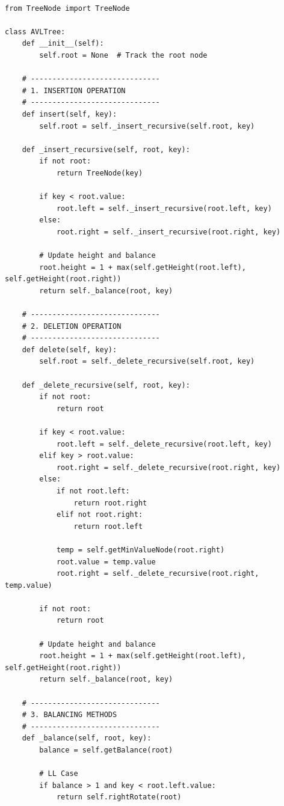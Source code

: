 \begin{lstlisting}
    
from TreeNode import TreeNode

class AVLTree:
    def __init__(self):
        self.root = None  # Track the root node

    # ------------------------------
    # 1. INSERTION OPERATION
    # ------------------------------
    def insert(self, key):
        self.root = self._insert_recursive(self.root, key)

    def _insert_recursive(self, root, key):
        if not root:
            return TreeNode(key)

        if key < root.value:
            root.left = self._insert_recursive(root.left, key)
        else:
            root.right = self._insert_recursive(root.right, key)

        # Update height and balance
        root.height = 1 + max(self.getHeight(root.left), self.getHeight(root.right))
        return self._balance(root, key)

    # ------------------------------
    # 2. DELETION OPERATION
    # ------------------------------
    def delete(self, key):
        self.root = self._delete_recursive(self.root, key)

    def _delete_recursive(self, root, key):
        if not root:
            return root

        if key < root.value:
            root.left = self._delete_recursive(root.left, key)
        elif key > root.value:
            root.right = self._delete_recursive(root.right, key)
        else:
            if not root.left:
                return root.right
            elif not root.right:
                return root.left

            temp = self.getMinValueNode(root.right)
            root.value = temp.value
            root.right = self._delete_recursive(root.right, temp.value)

        if not root:
            return root

        # Update height and balance
        root.height = 1 + max(self.getHeight(root.left), self.getHeight(root.right))
        return self._balance(root, key)

    # ------------------------------
    # 3. BALANCING METHODS
    # ------------------------------
    def _balance(self, root, key):
        balance = self.getBalance(root)

        # LL Case
        if balance > 1 and key < root.left.value:
            return self.rightRotate(root)


\end{lstlisting}
